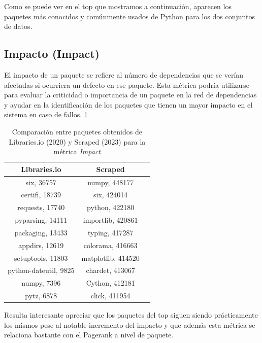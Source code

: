 Como se puede ver en el top que mostramos a continuación, aparecen los paquetes más conocidos y
comúnmente usados de Python para los dos conjuntos de datos.

\subsection{Impacto (Impact)}

El impacto de un paquete se refiere al número de dependencias que se verían afectadas si
ocurriera un defecto en ese paquete. Esta métrica podría utilizarse para evaluar la criticidad
o importancia de un paquete en la red de dependencias y ayudar en la identificación de los
paquetes que tienen un mayor impacto en el sistema en caso de fallos. \ref{tab:Comparación entre paquetes obtenidos de Libraries.io (2020) y Scraped (2023) para la métrica Impact}

\begin{table}[ht!]
    \centering
    \caption{Comparación entre paquetes obtenidos de Libraries.io (2020) y Scraped (2023) para la métrica \textit{Impact}}
    \begin{tabular}{|c|c|c|}
        \hline
        \textbf{Libraries.io} & \textbf{Scraped}   \\
        \hline
        six, 36757            & numpy, 448177      \\
        certifi, 18739        & six, 424014        \\
        requests, 17740       & python, 422180     \\
        pyparsing, 14111      & importlib, 420861  \\
        packaging, 13433      & typing, 417287     \\
        appdirs, 12619        & colorama, 416663   \\
        setuptools, 11803     & matplotlib, 414520 \\
        python-dateutil, 9825 & chardet, 413067    \\
        numpy, 7396           & Cython, 412181     \\
        pytz, 6878            & click, 411954      \\
        \hline
    \end{tabular}
    \label{tab:Comparación entre paquetes obtenidos de Libraries.io (2020) y Scraped (2023) para la métrica Impact}
\end{table}


Resulta interesante apreciar que los paquetes del top siguen siendo prácticamente los mismos
pese al notable incremento del impacto y que además esta métrica se relaciona bastante con el
Pagerank a nivel de paquete.

